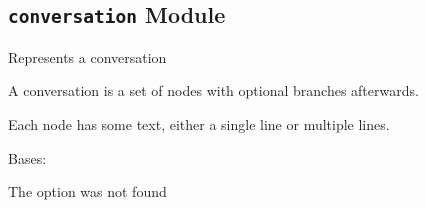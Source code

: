 \documentclass[letterpaper,10pt,english]{sphinxmanual}
\begin{document}
\subsection{\texttt{conversation} Module}
\label{blocks:module-serge.blocks.conversation}\label{blocks:conversation-module}
Represents a conversation

A conversation is a set of nodes with optional branches afterwards.

Each node has some text, either a single line or multiple lines.

\begin{fulllineitems}
\label{blocks:serge.blocks.conversation.BadOption}
Bases: 

The option was not found

\end{fulllineitems}

\end{document}
